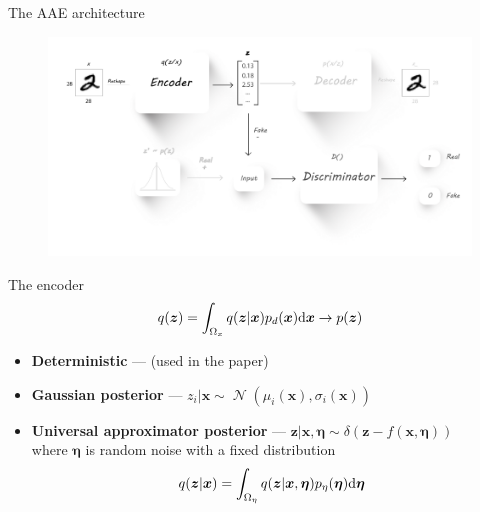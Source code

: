 \documentclass[10pt]{beamer}
\DeclareMathOperator{\Norm}{\mathcal N}
\newcommand{\vect}[1]{\boldsymbol{#1}} %
\begin{document}
\begin{frame}{The AAE architecture}
\begin{figure}
  \centering
  \includegraphics[width=\linewidth]{../images/aae-architecture-01-alt4.png}
\end{figure}
\end{frame}

\begin{frame}{The encoder}
\[ q(\vect z) = \int_{\Omega_x} q(\vect z | \vect x) p_d(\vect x) \text d \vect x  \to p(\vect z) \]
\begin{itemize}
  \setlength\itemsep{1.5em}
  \item \textbf{Deterministic} — (used in the paper)
  \item \textbf{Gaussian posterior} — $ z_i | \vect x \sim \Norm(\mu_i(\vect x), \sigma_i(\vect x)) $
  \item \textbf{Universal approximator posterior} — $ \vect z | \vect x, \vect \eta \sim \delta(\vect z - f(\vect x, \vect \eta)) $ \\ where $ \vect \eta $ is random noise with a fixed distribution
  \[ q(\vect z | \vect x) = \int_{\Omega_\eta} q(\vect z | \vect x, \vect \eta) p_\eta(\vect \eta) \text d \vect \eta \]
\end{itemize}
\end{frame}
\end{document}
